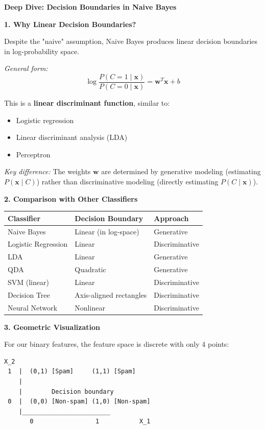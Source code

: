 \documentclass[12pt]{article}
\begin{document}
\begin{explanation}
\textbf{Deep Dive: Decision Boundaries in Naive Bayes}

\textbf{1. Why Linear Decision Boundaries?}

Despite the "naive" assumption, Naive Bayes produces linear decision boundaries in log-probability space.

\textit{General form:}
\[
\log \frac{P(C = 1 \mid \mathbf{x})}{P(C = 0 \mid \mathbf{x})} = \mathbf{w}^T \mathbf{x} + b
\]

This is a \textbf{linear discriminant function}, similar to:
\begin{itemize}
    \item Logistic regression
    \item Linear discriminant analysis (LDA)
    \item Perceptron
\end{itemize}

\textit{Key difference:} The weights $\mathbf{w}$ are determined by generative modeling (estimating $P(\mathbf{x} \mid C)$) rather than discriminative modeling (directly estimating $P(C \mid \mathbf{x})$).

\textbf{2. Comparison with Other Classifiers}

\begin{center}
\begin{tabular}{|l|l|l|}
\hline
\textbf{Classifier} & \textbf{Decision Boundary} & \textbf{Approach} \\
\hline
Naive Bayes & Linear (in log-space) & Generative \\
Logistic Regression & Linear & Discriminative \\
LDA & Linear & Generative \\
QDA & Quadratic & Generative \\
SVM (linear) & Linear & Discriminative \\
Decision Tree & Axis-aligned rectangles & Discriminative \\
Neural Network & Nonlinear & Discriminative \\
\hline
\end{tabular}
\end{center}

\textbf{3. Geometric Visualization}

For our binary features, the feature space is discrete with only 4 points:

\begin{verbatim}
X_2
 1  |  (0,1) [Spam]     (1,1) [Spam]
    |
    |        Decision boundary
 0  |  (0,0) [Non-spam] (1,0) [Non-spam]
    |________________________
       0                 1           X_1
\end{verbatim}


\end{explanation}
\end{document}
